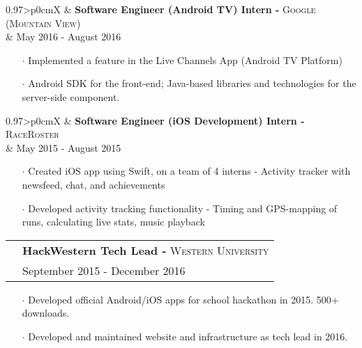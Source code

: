 \documentclass[letterpaper, oneside, final]{scrartcl} %
\newcommand{\gray}{\rowcolor[gray]{.90}} %
\begin{document}
\begin{center}
\begin{tabularx}{0.97\linewidth}{>{\raggedleft\scshape}p{0cm}X}
\gray & \textbf{Software Engineer (Android TV) Intern -} \textsc{Google (Mountain View)}\\
\gray & {May 2016 - August 2016}\\
\end{tabularx}
\vspace{-0.1cm}
\begin{itemize} \itemsep-0.2cm
\item[$\cdot$] Implemented a feature in the Live Channels App (Android TV Platform)
\item[$\cdot$] Android SDK for the front-end; Java-based libraries and technologies for the server-side component.
\end{itemize}

\vspace{-0.1cm}

\begin{tabularx}{0.97\linewidth}{>{\raggedleft\scshape}p{0cm}X}
\gray & \textbf{Software Engineer (iOS Development) Intern -} \textsc{RaceRoster}\\
\gray & {May 2015 - August 2015}\\
\end{tabularx}
\vspace{-0.1cm}
\begin{itemize} \itemsep-0.2cm
\item[$\cdot$] Created iOS app using Swift, on a team of 4 interns - Activity tracker with newsfeed, chat, and achievements \\
\item[$\cdot$] Developed activity tracking functionality - Timing and GPS-mapping of runs, calculating live stats, music playback
\end{itemize}

\vspace{-0.1cm}

\begin{tabularx}{0.97\linewidth}{>{\raggedleft\scshape}p{0cm}X}
\gray & \textbf{HackWestern Tech Lead -} \textsc{Western University}\\
\gray & {September 2015 - December 2016}\\
\end{tabularx}
\vspace{-0.1cm}
\begin{itemize} \itemsep-0.2cm
\item[$\cdot$] Developed official Android/iOS apps for school hackathon in 2015. 500+ downloads. \\
\item[$\cdot$] Developed and maintained website and infrastructure as tech lead in 2016.
\end{itemize}


\end{center}
\end{document}
